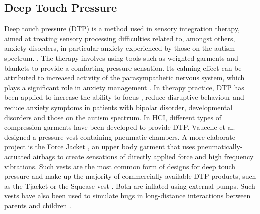 \subsection{Deep Touch Pressure}

Deep touch pressure (DTP) is a method used in sensory integration therapy, aimed at treating sensory processing difficulties related to, amongst others, anxiety disorders, in particular anxiety experienced by those on the autism spectrum. \cite{hsin-yung_chen_physiological_2013, grandin_calming_1992, krauss_effects_1987}. The therapy involves using tools such as weighted garments and blankets to provide a comforting pressure sensation. Its calming effect can be attributed to increased activity of the parasympathetic nervous system, which plays a significant role in anxiety management \cite{hsin-yung_chen_physiological_2013}. In therapy practice, DTP has been applied to increase the ability to focus \cite{fertel-daly_effects_2001}, reduce disruptive behaviour \cite{quigley_effects_2011} and reduce anxiety symptoms \cite{grandin_calming_1992} in patients with bipolar disorder, developmental disorders and those on the autism spectrum. In HCI, different types of compression garments have been developed to provide DTP. Vaucelle et al. \cite{vaucelle_design_2009} designed a pressure vest containing pneumatic chambers. A more elaborate project is the Force Jacket \cite{delazio_force_2018}, an upper body garment that uses pneumatically-actuated airbags to create sensations of directly applied force and high frequency vibrations. Such vests are the most common form of designs for deep touch pressure and make up the majority of commercially available DTP products, such as the Tjacket \cite{ltd_tjacket_2020} or the Squease vest \cite{ltd_squease_2014}. Both are inflated using external pumps. Such vests have also been used to simulate hugs in long-distance interactions between parents and children \cite{teh_huggy_2009}. 


